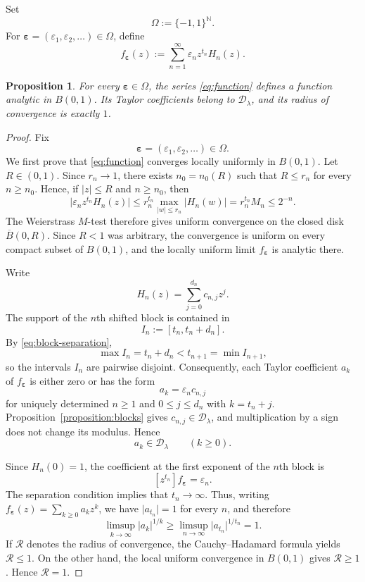 \documentclass[10pt,a4paper]{amsart}
\newtheorem{proposition}[theorem]{Proposition}
\numberwithin{equation}{section}
\newcommand{\N}{\mathbb N}
\newcommand{\D}{\mathcal D}
\newcommand{\abs}[1]{\lvert #1\rvert}
\newcommand{\B}{B(0,1)}
\begin{document}
Set
\[
        \Omega:=\{-1,1\}^{\N}.
\]
For $\boldsymbol\varepsilon=(\varepsilon_1,\varepsilon_2,\ldots)\in\Omega$,
define
\begin{equation}\label{eq:function}
        f_{\boldsymbol\varepsilon}(z)
        :=\sum_{n=1}^{\infty}
        \varepsilon_nz^{t_n}H_n(z).
\end{equation}

\begin{proposition}\label{proposition:analytic}
For every $\boldsymbol\varepsilon\in\Omega$, the series
\eqref{eq:function} defines a function analytic in $\B$. Its Taylor
coefficients belong to $\D_\lambda$, and its radius of convergence is
exactly $1$.
\end{proposition}

\begin{proof}
Fix
\[
        \boldsymbol\varepsilon
        =(\varepsilon_1,\varepsilon_2,\ldots)\in\Omega.
\]
We first prove that \eqref{eq:function} converges locally uniformly in
$\B$. Let $R\in(0,1)$. Since $r_n\to1$, there exists $n_0=n_0(R)$ such
that $R\leq r_n$ for every $n\geq n_0$. Hence, if $\abs z\leq R$ and
$n\geq n_0$, then
\[
        \abs{\varepsilon_nz^{t_n}H_n(z)}
        \leq
        r_n^{t_n}\max_{\abs w\leq r_n}\abs{H_n(w)}
        =
        r_n^{t_n}M_n
        \leq2^{-n}.
\]
The Weierstrass $M$-test therefore gives uniform convergence on the closed
disk $\overline{B}(0,R)$. Since $R<1$ was arbitrary, the convergence is
uniform on every compact subset of $\B$, and the locally uniform limit
$f_{\boldsymbol\varepsilon}$ is analytic there.

Write
\[
        H_n(z)=\sum_{j=0}^{d_n}c_{n,j}z^j.
\]
The support of the $n$th shifted block is contained in
\[
        I_n:=[t_n,t_n+d_n].
\]
By \eqref{eq:block-separation},
\[
        \max I_n=t_n+d_n<t_{n+1}=\min I_{n+1},
\]
so the intervals $I_n$ are pairwise disjoint. Consequently, each Taylor
coefficient $a_k$ of $f_{\boldsymbol\varepsilon}$ is either zero or has the
form
\[
        a_k=\varepsilon_nc_{n,j}
\]
for uniquely determined $n\geq1$ and $0\leq j\leq d_n$ with
$k=t_n+j$. Proposition~\ref{proposition:blocks} gives
$c_{n,j}\in\D_\lambda$, and multiplication by a sign does not change its
modulus. Hence
\[
        a_k\in\D_\lambda
        \qquad(k\geq0).
\]

Since $H_n(0)=1$, the coefficient at the first exponent of the $n$th block
is
\begin{equation}\label{eq:marker}
        [z^{t_n}]f_{\boldsymbol\varepsilon}
        =
        \varepsilon_n.
\end{equation}
The separation condition implies that $t_n\to\infty$. Thus, writing
$f_{\boldsymbol\varepsilon}(z)=\sum_{k\geq0}a_kz^k$, we have
$\abs{a_{t_n}}=1$ for every $n$, and therefore
\[
        \limsup_{k\to\infty}\abs{a_k}^{1/k}
        \geq
        \limsup_{n\to\infty}\abs{a_{t_n}}^{1/t_n}
        =1.
\]
If $\mathcal R$ denotes the radius of convergence, the
Cauchy--Hadamard formula yields $\mathcal R\leq1$. On the other hand, the
local uniform convergence in $\B$ gives $\mathcal R\geq1$. Hence
$\mathcal R=1$.
\end{proof}
\end{document}
